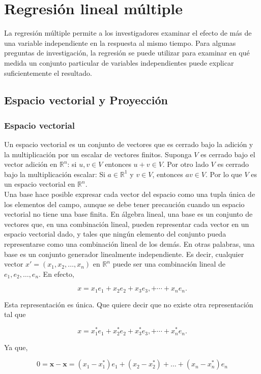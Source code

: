 \chapter{Regresión lineal múltiple}
La regresión múltiple permite a los investigadores examinar el efecto de más de una variable independiente en la respuesta al mismo tiempo. Para algunas preguntas de investigación, la regresión se puede utilizar para examinar en qué medida un conjunto particular de variables independientes puede explicar suficientemente el resultado.

\section{Espacio vectorial y Proyección}

\subsection{Espacio vectorial}
Un espacio vectorial es un conjunto de vectores  que es cerrado bajo  la adición y la multiplicación por un escalar de vectores finitos. Suponga $V$ es cerrado bajo el vector adición en $\mathbb{R}^n$: si $u,v\in V$ entonces $u+v\in V$. Por otro lado $V$ es cerrado bajo la multiplicación escalar: Si $a\in \mathbb{R}^1$ y $v\in V$, entonces $av\in V$. Por lo que $V$ es un espacio vectorial en $\mathbb{R}^n$. \\

Una base hace posible expresar cada vector del espacio como una tupla única de los elementos del campo, aunque se debe tener precaución cuando un espacio vectorial no tiene una base finita. En álgebra lineal, una base es un conjunto de vectores que, en una combinación lineal, pueden representar cada vector en un espacio vectorial dado, y tales que ningún elemento del conjunto pueda representarse como una combinación lineal de los demás. En otras palabras, una base es un conjunto generador linealmente independiente. Es decir, cualquier vector $x'=(x_1,x_2,\ldots,x_n)$ en $\mathbb{R}^n$ puede ser una combinación lineal de $e_1,e_2,\ldots,e_n$. En efecto,

$$x=x_1e_1+x_2e_2+x_3e_3,+\cdots+x_ne_n.$$

Esta representación es única. Que quiere decir que no existe otra representación tal que

$$x=x_1^*e_1+x_2^*e_2+x_3^*e_3,+\cdots+x_n^*e_n.$$

Ya que,

$$0=\textbf{x}-\textbf{x}=(x_1-x_1^*)e_1+(x_2-x_2^*)+\ldots+(x_n-x_n^*)e_n$$


